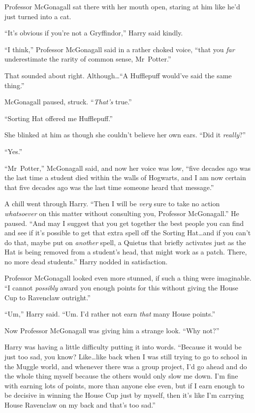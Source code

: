 Professor McGonagall sat there with her mouth open, staring at him like he’d just turned into a cat.

“It’s obvious if you’re not a Gryffindor,” Harry said kindly.

“I think,” Professor McGonagall said in a rather choked voice, “that you \emph{far} underestimate the rarity of common sense, Mr~Potter.”

That sounded about right. Although…“A Hufflepuff would’ve said the same thing.”

McGonagall paused, struck. “\emph{That’s} true.”

“Sorting Hat offered me Hufflepuff.”

She blinked at him as though she couldn’t believe her own ears. “Did it \emph{really}?”

“Yes.”

“Mr~Potter,” McGonagall said, and now her voice was low, “five decades ago was the last time a student died within the walls of Hogwarts, and I am now certain that five decades ago was the last time someone heard that message.”

A chill went through Harry. “Then I will be \emph{very} sure to take no action \emph{whatsoever} on this matter without consulting you, Professor McGonagall.” He paused. “And may I suggest that you get together the best people you can find and see if it’s possible to get that extra spell off the Sorting Hat…and if you can’t do that, maybe put on \emph{another} spell, a Quietus that briefly activates just as the Hat is being removed from a student’s head, that might work as a patch. There, no more dead students.” Harry nodded in satisfaction.

Professor McGonagall looked even more stunned, if such a thing were imaginable. “I cannot \emph{possibly} award you enough points for this without giving the House Cup to Ravenclaw outright.”

“Um,” Harry said. “Um. I’d rather not earn \emph{that} many House points.”

Now Professor McGonagall was giving him a strange look. “Why not?”

Harry was having a little difficulty putting it into words. “Because it would be just too sad, you know? Like…like back when I was still trying to go to school in the Muggle world, and whenever there was a group project, I’d go ahead and do the whole thing myself because the others would only slow me down. I’m fine with earning lots of points, more than anyone else even, but if I earn enough to be decisive in winning the House Cup just by myself, then it’s like I’m carrying House Ravenclaw on my back and that’s too sad.”

